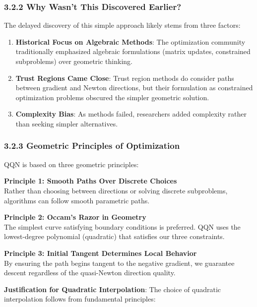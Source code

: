 \hypertarget{why-wasnt-this-discovered-earlier}{%
\subsubsection{3.2.2 Why Wasn't This Discovered Earlier?}\label{why-wasnt-this-discovered-earlier}}

The delayed discovery of this simple approach likely stems from three factors:

\begin{enumerate}
\def\labelenumi{\arabic{enumi}.}
\item
  \textbf{Historical Focus on Algebraic Methods}: The optimization community traditionally emphasized algebraic formulations
  (matrix updates, constrained subproblems) over geometric thinking.
\item
  \textbf{Trust Regions Came Close}: Trust region methods do consider paths between gradient and Newton directions, but
  their formulation as constrained optimization problems obscured the simpler geometric solution.
\item
  \textbf{Complexity Bias}: As methods failed, researchers added complexity rather than seeking simpler alternatives.
\end{enumerate}

\hypertarget{geometric-principles-of-optimization}{%
\subsubsection{3.2.3 Geometric Principles of Optimization}\label{geometric-principles-of-optimization}}

QQN is based on three geometric principles:

\textbf{Principle 1: Smooth Paths Over Discrete Choices}\\
Rather than choosing between directions or solving
discrete subproblems, algorithms can follow smooth parametric paths.

\textbf{Principle 2: Occam's Razor in Geometry}\\
The simplest curve satisfying boundary conditions is preferred. QQN uses the lowest-degree
polynomial (quadratic) that satisfies our three constraints.

\textbf{Principle 3: Initial Tangent Determines Local Behavior}\\
By ensuring the path begins tangent
to the negative gradient, we guarantee descent regardless of the quasi-Newton direction quality.

\textbf{Justification for Quadratic Interpolation}: The choice of quadratic interpolation follows from fundamental
principles:


